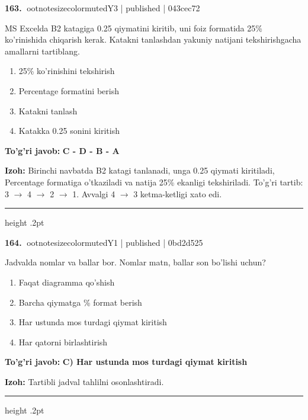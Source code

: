 \documentclass[10pt,a4paper]{article}
\begin{document}
\textbf{\color{ink}163.} {ootnotesizecolor{muted}Y3 | published | 043cec72}
\par
MS Excelda B2 katagiga 0.25 qiymatini kiritib, uni foiz formatida 25\% ko'rinishida chiqarish kerak. Katakni tanlashdan yakuniy natijani tekshirishgacha amallarni tartiblang.
\begin{enumerate}[label=\Alph*),leftmargin=9mm]
\item 25\% ko'rinishini tekshirish
\item Percentage formatini berish
\item Katakni tanlash
\item Katakka 0.25 sonini kiritish
\end{enumerate}
\begin{tcolorbox}[enhanced,breakable,colback=teal!4,colframe=teal!55!black,boxrule=0.45pt,arc=1.2mm,left=2.8mm,right=2.8mm,top=2mm,bottom=2mm]
\textbf{\color{teal}To'g'ri javob:} \textbf{C - D - B - A}
\par\smallskip
\textbf{Izoh:} Birinchi navbatda B2 katagi tanlanadi, unga 0.25 qiymati kiritiladi, Percentage formatiga o'tkaziladi va natija 25\% ekanligi tekshiriladi. To'g'ri tartib: 3 \ensuremath{\rightarrow} 4 \ensuremath{\rightarrow} 2 \ensuremath{\rightarrow} 1. Avvalgi 4 \ensuremath{\rightarrow} 3 ketma-ketligi xato edi.
\end{tcolorbox}
\vspace{2mm}\hrule height .2pt\vspace{2mm}

\textbf{\color{ink}164.} {ootnotesizecolor{muted}Y1 | published | 0bd2d525}
\par
Jadvalda nomlar va ballar bor. Nomlar matn, ballar son bo'lishi uchun?
\begin{enumerate}[label=\Alph*),leftmargin=9mm]
\item Faqat diagramma qo'shish
\item Barcha qiymatga \% format berish
\item Har ustunda mos turdagi qiymat kiritish
\item Har qatorni birlashtirish
\end{enumerate}
\begin{tcolorbox}[enhanced,breakable,colback=teal!4,colframe=teal!55!black,boxrule=0.45pt,arc=1.2mm,left=2.8mm,right=2.8mm,top=2mm,bottom=2mm]
\textbf{\color{teal}To'g'ri javob:} \textbf{C) Har ustunda mos turdagi qiymat kiritish}
\par\smallskip
\textbf{Izoh:} Tartibli jadval tahlilni osonlashtiradi.
\end{tcolorbox}
\vspace{2mm}\hrule height .2pt\vspace{2mm}
\end{document}
